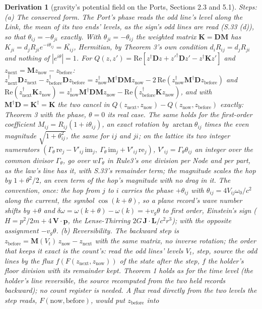 \documentclass[pdflatex,sn-mathphys-num]{sn-jnl}
\theoremstyle{thmstyleone}
\newtheorem{derivation}{Derivation}
\begin{document}
\begin{derivation}[gravity's potential field on the Ports, Sections 2.3 and 5.1]
\emph{Steps:} (a) \emph{The conserved form.} The Port's phase reads the odd line's level along the Link, the mean of its two ends' levels, as the sign's odd lines are read (S.33 (d)), so that $\theta_{ij} = -\theta_{ji}$ exactly. With $\theta_{ji} = -\theta_{ij}$ the weighted matrix $\mathbf K = \mathbf D\mathbf M$ has $K_{ji} = d_j R_{ji}e^{-i\theta_{ij}} = \overline{K_{ij}}$, Hermitian, by Theorem 3's own condition $d_iR_{ij} = d_jR_{ji}$ and nothing of $|e^{i\theta}| = 1$. For $Q(z, z') = \mathrm{Re}[z^\dagger\mathbf D z + z'^\dagger\mathbf D z' - z^\dagger\mathbf K z']$ and $z_{\mathrm{next}} = \mathbf M z_{\mathrm{now}} - z_{\mathrm{before}}$: $z_{\mathrm{next}}^\dagger\mathbf D z_{\mathrm{next}} - z_{\mathrm{before}}^\dagger\mathbf D z_{\mathrm{before}} = z_{\mathrm{now}}^\dagger\mathbf M^\dagger\mathbf D\mathbf M z_{\mathrm{now}} - 2\,\mathrm{Re}(z_{\mathrm{now}}^\dagger\mathbf M^\dagger\mathbf D z_{\mathrm{before}})$ and $\mathrm{Re}(z_{\mathrm{next}}^\dagger\mathbf K z_{\mathrm{now}}) = z_{\mathrm{now}}^\dagger\mathbf M^\dagger\mathbf D\mathbf M z_{\mathrm{now}} - \mathrm{Re}(z_{\mathrm{before}}^\dagger\mathbf K z_{\mathrm{now}})$, and with $\mathbf M^\dagger\mathbf D = \mathbf K^\dagger = \mathbf K$ the two cancel in $Q(z_{\mathrm{next}}, z_{\mathrm{now}}) - Q(z_{\mathrm{now}}, z_{\mathrm{before}})$ exactly: Theorem 3 with the phase, $\theta = 0$ its real case. The same holds for the first-order coefficient $M_{ij} = R_{ij}(1 + i\theta_{ij})$, an exact rotation by $\arctan\theta_{ij}$ times the even magnitude $\sqrt{1 + \theta_{ij}^2}$, the same for $ij$ and $ji$; on the lattice its two integer numerators $(\Gamma_\theta\,\mathrm{re}_j - V'_{ij}\,\mathrm{im}_j,\ \Gamma_\theta\,\mathrm{im}_j + V'_{ij}\,\mathrm{re}_j)$, $V'_{ij} = \Gamma_\theta\theta_{ij}$ an integer over the common divisor $\Gamma_\theta$, go over $w\Gamma_\theta$ in Rule3's one division per Node and per part, as the law's line has it, with S.33's remainder term; the magnitude scales the hop by $1 + \theta^2 / 2$, an even term of the hop's magnitude with no drag in it. The convention, once: the hop from $j$ to $i$ carries the phase $+\theta_{ij}$ with $\theta_{ij} = 4V_{ij}\omega_0 / c^2$ along the current, the symbol $\cos(k + \theta)$, so a plane record's wave number shifts by $+\theta$ and $\delta\omega = \omega(k + \theta) - \omega(k) = +v_g\theta$ to first order, Einstein's sign ($H = p^2 / 2m + 4\,\mathbf V\cdot\mathbf p$, the Lense-Thirring $2G\,\mathbf J\cdot\mathbf L / c^2r^3$); with the opposite assignment $-v_g\theta$. (b) \emph{Reversibility.} The backward step is $z_{\mathrm{before}} = \mathbf M(V_t)\,z_{\mathrm{now}} - z_{\mathrm{next}}$ with the same matrix, no inverse rotation; the order that keeps it exact is the count's: read the odd lines' levels $V_t$, step, source the odd lines by the flux $f(F(z_{\mathrm{next}}, z_{\mathrm{now}}))$ of the state after the step, $f$ the holder's floor division with its remainder kept. Theorem 1 holds as for the time level (the holder's line reversible, the source recomputed from the two held records backward); no count register is needed. A flux read directly from the two levels the step reads, $F(\mathrm{now}, \mathrm{before})$, would put $z_{\mathrm{before}}$ into 
\end{derivation}
\end{document}
